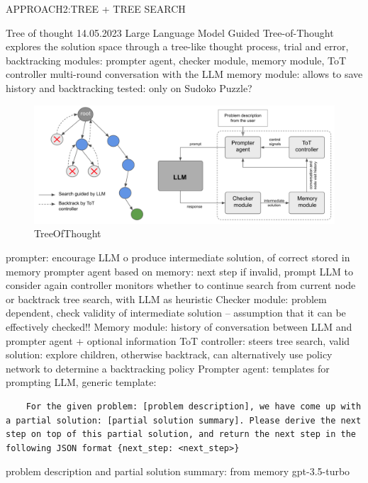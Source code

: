 \documentclass{article}
\begin{document}
APPROACH2:TREE + TREE SEARCH

Tree of thought
\cite{long_large_2023}14.05.2023 Large Language Model Guided Tree-of-Thought
explores the solution space through a tree-like thought process, trial and error, backtracking
modules: prompter agent, checker module, memory module, ToT controller
multi-round conversation with the LLM
memory module: allows to save history and backtracking
tested: only on Sudoko Puzzle?
\begin{figure}[h]
	\centering
	\includegraphics[width=0.7\linewidth]{TreeOfThought.png}
	\caption{TreeOfThought \cite{long_large_2023}}
	\label{fig:treeofthought}
\end{figure}
prompter: encourage LLM o produce intermediate solution, of correct stored in memory
prompter agent based on memory: next step
if invalid, prompt LLM to consider again
controller monitors whether to continue search from current node or backtrack
tree search, with LLM as heuristic
Checker module: problem dependent, check validity of intermediate solution -- assumption that it can be effectively checked!!
Memory module: history of conversation between LLM and prompter agent +  optional information
ToT controller: steers tree search, valid solution: explore children, otherwise backtrack, can alternatively use policy network to determine a backtracking policy
Prompter agent: templates for prompting LLM,
generic template:
\begin{verbatim}
	For the given problem: [problem description], we have come up with a partial solution: [partial solution summary]. Please derive the next step on top of this partial solution, and return the next step in the following JSON format {next_step: <next_step>}
\end{verbatim}
problem description and partial solution summary: from memory
gpt-3.5-turbo
\end{document}
